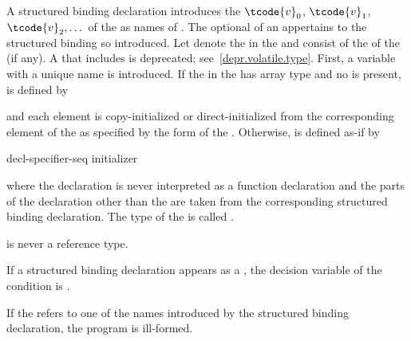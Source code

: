 \pnum
A structured binding declaration introduces the 
$\tcode{v}_0$, $\tcode{v}_1$, $\tcode{v}_2, \dotsc$
of the
 as names
of .
The optional  of
an 
appertains to the structured binding so introduced.
Let \cv{} denote the  in
the  and
 consist of the  of
the  (if any).
A \cv{} that includes  is deprecated;
see~\ref{depr.volatile.type}.
First, a variable with a unique name  is introduced. If the
 in the 
has array type   and no  is present,
 is defined by
\begin{ncbnf}
  \cv{}   \terminal{;}
\end{ncbnf}
and each element is copy-initialized or direct-initialized
from the corresponding element of the  as specified
by the form of the .
Otherwise, 
is defined as-if by
\begin{ncbnf}
 decl-specifier-seq   initializer \terminal{;}
\end{ncbnf}
where
the declaration is never interpreted as a function declaration and
the parts of the declaration other than the  are taken
from the corresponding structured binding declaration.
The type of the 
 is called .
\begin{note}
 is never a reference type.
\end{note}

\pnum
If a structured binding declaration appears as a ,
the decision variable of the condition is .

\pnum
If the  refers to
one of the names introduced by the structured binding declaration,
the program is ill-formed.

